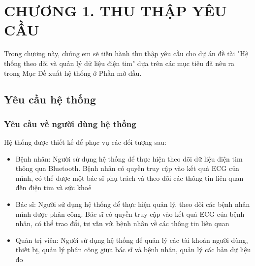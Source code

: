 
\section*{CHƯƠNG 1. THU THẬP YÊU CẦU}
\setcounter{section}{1}
\setcounter{subsection}{0} %
\setcounter{table}{0} %
\setcounter{figure}{0} %
Trong chương này, chúng em sẽ tiến hành thu thập yêu cầu cho dự án đề tài "Hệ thống theo dõi và quản lý dữ liệu điện tim" dựa trên các mục tiêu
đã nêu ra trong Mục Đề xuất hệ thống ở Phần mở đầu.

\subsection{Yêu cầu hệ thống}
\subsubsection{Yêu cầu về người dùng hệ thống}
Hệ thống được thiết kế để phục vụ các đối tượng sau:
\begin{adjustwidth}{1.5em}{}
\begin{itemize}
    \item Bệnh nhân: Người sử dụng hệ thống để thực hiện theo dõi dữ liệu điện tim thông qua Bluetooth. Bệnh nhân có quyền truy cập vào kết quả ECG của mình, có thể được một bác sĩ phụ trách và theo dõi các thông tin liên quan đến điện tim và sức khoẻ
    \item Bác sĩ: Người sử dụng hệ thống để thực hiện quản lý, theo dõi các bệnh nhân mình được phân công. Bác sĩ có quyền truy cập vào kết quả ECG của bệnh nhân, có thể trao đổi, tư vấn với bệnh nhân về các thông tin liên quan
    \item Quản trị viên: Người sử dụng hệ thống để quản lý các tài khoản người dùng, thiết bị, quản lý phân công giữa bác sĩ và bệnh nhân, quản lý các bản dữ liệu đo
\end{itemize}
\end{adjustwidth}

